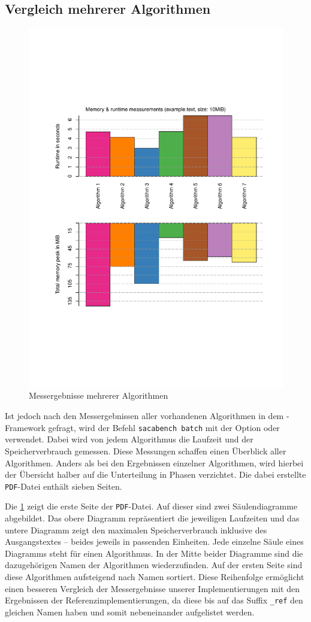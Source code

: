 \subsection{Vergleich mehrerer Algorithmen}
\label{framework:bechmark:sacabench-batch}

\begin{figure}
	\includegraphics[page = 1, width=.5\textwidth]{kapitel/3_framework/benchmark/sacabench-batch/beispiel_batch_saeule.pdf}
	\caption{Messergebnisse mehrerer Algorithmen}
	\label{pdf:benchmark:batch:saeule}
\end{figure}

Ist jedoch nach den Messergebnissen aller vorhandenen Algorithmen in dem \sacabench-Framework gefragt, wird der Befehl \texttt{sacabench batch} mit der Option  oder  verwendet. Dabei wird von jedem Algorithmus die Laufzeit und der Spei\-cher\-ver\-brauch gemessen. Diese Messungen schaffen einen Überblick aller Algorithmen. Anders als bei den Ergebnissen einzelner Algorithmen, wird hierbei der Übersicht halber auf die Unterteilung in Phasen verzichtet. Die dabei erstellte \texttt{PDF}-Datei enthält sieben Seiten.

Die \cref{pdf:benchmark:batch:saeule} zeigt die erste Seite der \texttt{PDF}-Datei. Auf dieser sind zwei Säulendiagramme abgebildet. Das obere Diagramm repräsentiert die jeweiligen Laufzeiten und das untere Diagramm zeigt den maximalen Spei\-cher\-ver\-brauch inklusive des Ausgangstextes -- beides jeweils in passenden Einheiten. Jede einzelne Säule eines Diagramms steht für einen Algorithmus. In der Mitte beider Diagramme sind die dazugehörigen Namen der Algorithmen wiederzufinden. Auf der ersten Seite sind diese Algorithmen aufsteigend nach Namen sortiert. Diese Reihenfolge ermöglicht einen besseren Vergleich der Messergebnisse unserer Implementierungen mit den Ergebnissen der Referenzimplementierungen, da diese bis auf das Suffix \texttt{\_ref} den gleichen Namen haben und somit nebeneinander aufgelistet werden.


